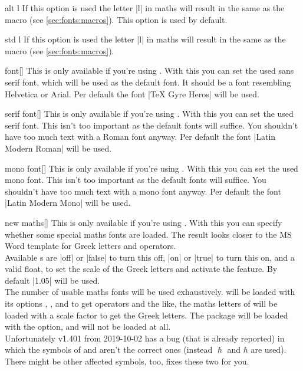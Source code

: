 \begin{describeopt}{alt l}
  If this option is used the letter |l| in maths will result in the same as the
   macro (see \autoref{sec:fonts:macros}). This option is used by
  default.
\end{describeopt}
\begin{describeopt}{std l}
  If this option is used the letter |l| in maths will result in the same as the
   macro (see \autoref{sec:fonts:macros}).
\end{describeopt}
\begin{describeopt}{font}[]
  This is only available if you're using \luaxetex. With this you can set the
  used sans serif font, which will be used as the default font. It should be
  a font resembling Helvetica or Arial. Per default the font
  \bverb|TeX Gyre Heros| will be used.
\end{describeopt}
\begin{describeopt}{serif font}[]
  This is only available if you're using \luaxetex. With this you can set the
  used serif font. This isn't too important as the default fonts will suffice.
  You shouldn't have too much text with a Roman font anyway. Per default the
  font \bverb|Latin Modern Roman| will be used.
\end{describeopt}
\begin{describeopt}{mono font}[]
  This is only available if you're using \luaxetex. With this you can set the
  used mono font. This isn't too important as the default fonts will suffice.
  You shouldn't have too much text with a mono font anyway. Per default the
  font \bverb|Latin Modern Mono| will be used.
\end{describeopt}
\begin{describeopt}{new maths}[]
  This is only available if you're using . With this you can
  specify whether some special maths fonts are loaded. The result looks closer
  to the MS Word template for Greek letters and operators.\\
  Available s are |off| or |false| to turn this off, |on| or |true|
  to turn this on, and a valid float, to set the scale of the Greek letters and
  activate the feature.  By default |1.05| will be used.\\
  The number of usable maths fonts will be used exhaustively. 
  will be loaded with its options , ,
   and  to get operators and the like, the
  maths letters of  will be loaded with a scale factor to get the
  Greek letters.  The  package will be loaded with the 
  option, and  will not be loaded at all.\\
  Unfortunately  v1.401 from 2019-10-02 has a bug (that is
  already reported) in which the symbols of  and  aren't
  the correct ones (instead $\hslash$ and $\hbar$ are used). There might be
  other affected symbols, too,  fixes these two for you.
\end{describeopt}
